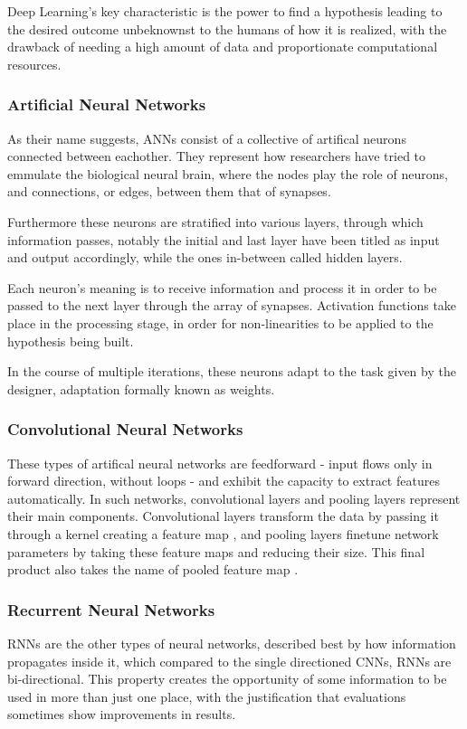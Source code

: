 \documentclass[a4paper, 12pt]{article}
\begin{document}
Deep Learning's key characteristic is the power to find a hypothesis leading to the desired outcome unbeknownst to the
humans of how it is realized, with the drawback of needing a high amount of data and proportionate computational resources.

\subsubsection*{Artificial Neural Networks}
As their name suggests, ANNs consist of a collective of artifical neurons connected between eachother. They represent how
researchers have tried to emmulate the biological neural brain, where the nodes play the role of neurons, and connections,
or edges, between them that of synapses.

Furthermore these neurons are stratified into various layers, through which information passes, notably the initial and last
layer have been titled as input and output accordingly, while the ones in-between called hidden layers.

Each neuron's meaning is to receive information and process it in order to be passed to the next layer through the
array of synapses. Activation functions take place in the processing stage, in order for non-linearities to be applied
to the hypothesis being built.

In the course of multiple iterations, these neurons adapt to the task given by the designer, adaptation formally known as weights.

\subsubsection*{Convolutional Neural Networks}
These types of artifical neural networks are feedforward - input flows only in forward direction, without loops - and exhibit
the capacity to extract features automatically. In such networks, convolutional layers and pooling layers represent
their main components. Convolutional layers transform the data by passing it through a kernel creating a feature map
, and pooling layers finetune network parameters by taking these feature maps and reducing their size.
This final product also takes the name of pooled feature map \cite{li2021survey}.

\subsubsection*{Recurrent Neural Networks}
RNNs are the other types of neural networks, described best by how information propagates inside it, which compared to
the single directioned CNNs, RNNs are bi-directional. This property creates the opportunity of some information to be
used in more than just one place, with the justification that evaluations sometimes show improvements in results.
\end{document}
